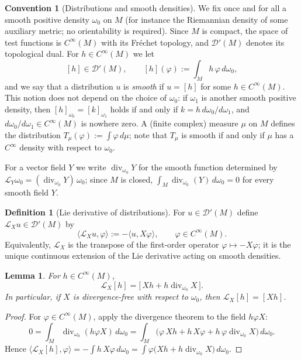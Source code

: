\documentclass[11pt]{amsart}
\theoremstyle{plain}
\newtheorem{lemma}[theorem]{Lemma}
\theoremstyle{definition}
\newtheorem{definition}[theorem]{Definition}
\newtheorem{convention}[theorem]{Convention}
\theoremstyle{remark}
\newcommand{\Dp}{\mathcal{D}'}
\newcommand{\Lx}{\mathcal{L}_X}
\begin{document}
\begin{convention}[Distributions and smooth densities]\label{conv:distr}
We fix once and for all a smooth positive density $\omega_0$ on $M$ (for
instance the Riemannian density of some auxiliary metric; no orientability
is required). Since $M$ is compact, the space of test functions is
$C^\infty(M)$ with its Fr\'echet topology, and $\Dp(M)$ denotes its
topological dual. For $h\in C^\infty(M)$ we let
\[
[h]\in \Dp(M),\qquad [h](\varphi):=\int_M h\,\varphi\,d\omega_0 ,
\]
and we say that a distribution $u$ is \emph{smooth} if $u=[h]$ for some
$h\in C^\infty(M)$. This notion does not depend on the choice of
$\omega_0$: if $\omega_1$ is another smooth positive density, then
$[h]_{\omega_0}=[k]_{\omega_1}$ holds if and only if
$k=h\,d\omega_0/d\omega_1$, and $d\omega_0/d\omega_1\in C^\infty(M)$ is
nowhere zero. A (finite complex) measure $\mu$ on $M$ defines the
distribution $T_\mu(\varphi):=\int\varphi\,d\mu$; note that $T_\mu$ is
smooth if and only if $\mu$ has a $C^\infty$ density with respect to
$\omega_0$.
\end{convention}

For a vector field $Y$ we write $\operatorname{div}_{\omega_0}Y$ for the
smooth function determined by
$\mathcal L_Y\omega_0=(\operatorname{div}_{\omega_0}Y)\,\omega_0$; since
$M$ is closed, $\int_M \operatorname{div}_{\omega_0}(Y)\,d\omega_0=0$ for
every smooth field $Y$.

\begin{definition}[Lie derivative of distributions]\label{def:Lieder}
For $u\in\Dp(M)$ define $\Lx u\in\Dp(M)$ by
\begin{equation}\label{eq:Lieder}
\langle \Lx u,\varphi\rangle:=-\langle u,X\varphi\rangle ,
\qquad \varphi\in C^\infty(M).
\end{equation}
Equivalently, $\Lx$ is the transpose of the first-order operator
$\varphi\mapsto -X\varphi$; it is the unique continuous extension of the
Lie derivative acting on smooth densities.
\end{definition}

\begin{lemma}\label{lem:onsmooth}
For $h\in C^\infty(M)$,
\[
\Lx[h]=\bigl[\,Xh+h\operatorname{div}_{\omega_0}X\,\bigr].
\]
In particular, if $X$ is divergence-free with respect to $\omega_0$, then
$\Lx[h]=[Xh]$.
\end{lemma}

\begin{proof}
For $\varphi\in C^\infty(M)$, apply the divergence theorem to the field
$h\varphi X$:
\[
0=\int_M \operatorname{div}_{\omega_0}(h\varphi X)\,d\omega_0
 =\int_M\bigl(\varphi\,Xh+h\,X\varphi
+h\,\varphi\operatorname{div}_{\omega_0}X\bigr)\,d\omega_0 .
\]
Hence $\langle \Lx[h],\varphi\rangle=-\int h\,X\varphi\,d\omega_0
=\int \varphi\bigl(Xh+h\operatorname{div}_{\omega_0}X\bigr)\,d\omega_0$.
\end{proof}
\end{document}
